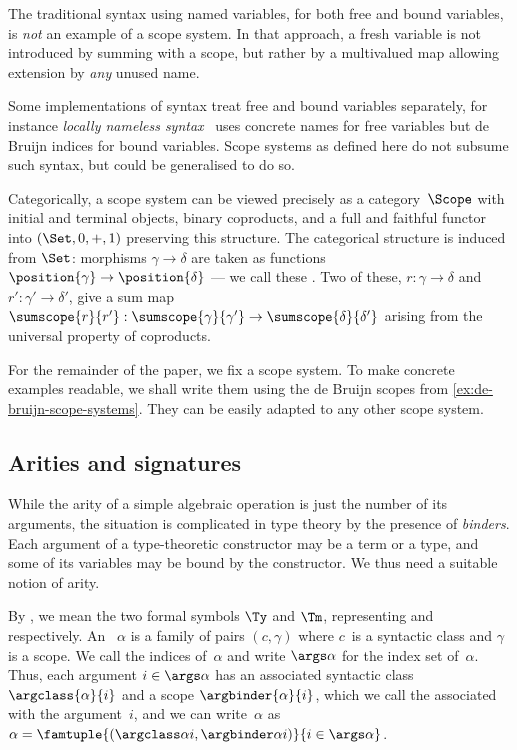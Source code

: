 \begin{example}
  The traditional syntax using named variables, for both free and bound variables, is \emph{not} an example of a scope system.
  In that approach, a fresh variable is not introduced by summing with a scope, but rather by a multivalued map allowing extension by \emph{any} unused name.
\end{example}

Some implementations of syntax treat free and bound variables separately, for instance \emph{locally nameless syntax}~\citep{mckinna93:_pure_type_system_formal} uses concrete names for free variables but de Bruijn indices for bound variables.
%
Scope systems as defined here do not subsume such syntax, but could be generalised to do so.

Categorically, a scope system can be viewed precisely as a category~$\Scope$ with initial and terminal objects, binary coproducts, and a full and faithful functor into $(\Set, 0, +, 1)$ preserving this structure.
%
The categorical structure is induced from $\Set$: morphisms $\gamma \to \delta$ are taken as functions $\position{\gamma} \to \position{\delta}$ --- we call these .
%
Two of these, $r : \gamma \to \delta$ and $r' : \gamma' \to \delta'$, give a sum map $\sumscope{r}{r'} : \sumscope{\gamma}{\gamma'} \to \sumscope{\delta}{\delta'}$ arising from the universal property of coproducts.

For the remainder of the paper, we fix a scope system. To make concrete examples readable, we shall write them using the de Bruijn scopes from \cref{ex:de-bruijn-scope-systems}. They can be easily adapted to any other scope system.

\subsection{Arities and signatures}
\label{sec:arities-signatures}


While the arity of a simple algebraic operation is just the number of its arguments, the situation is complicated in type theory by the presence of \emph{binders}. Each argument of a type-theoretic constructor may be a term or a type, and some of its variables may be bound by the constructor. We thus need a suitable notion of arity.

\begin{definition}
  \label{def:syntactic-class}\label{def:arity}%
  By , we mean the two formal symbols $\Ty$ and $\Tm$, representing  and  respectively.
  An ~$\alpha$ is a family of pairs $(c, \gamma)$ where $c$~is a syntactic class and $\gamma$ is a scope.
  We call the indices of~$\alpha$  and write $\args \alpha$ for the index set of~$\alpha$.
  Thus, each argument $i \in \args \alpha$ has an associated syntactic class $\argclass{\alpha}{i}$ and a scope $\argbinder{\alpha}{i}$, which we call the  associated with the argument~$i$, and we can write~$\alpha$ as $\alpha = \famtuple{(\argclass \alpha i, \argbinder \alpha i)}{i \in \args \alpha}$.
\end{definition}

